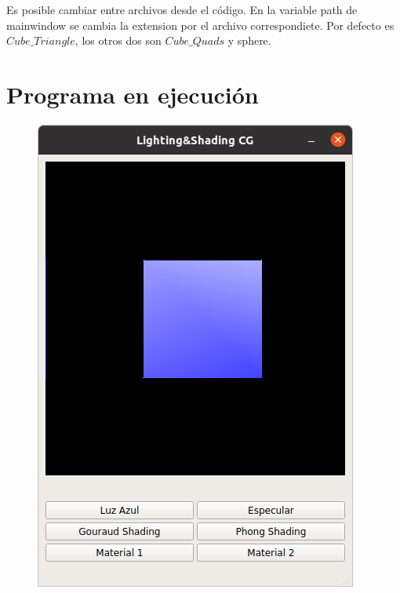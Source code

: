 \documentclass[12pt]{article}
\begin{document}
Es posible cambiar entre archivos desde el código. En la variable path de mainwindow se cambia la extension por el archivo correspondiete. Por defecto es $Cube\_Triangle$, los otros dos son $Cube\_Quads$ y sphere.



\section{Programa en ejecución}

\begin{figure}[H]
\centering
\includegraphics[scale=0.5]{images/ej1.png}

\end{figure}
\end{document}
